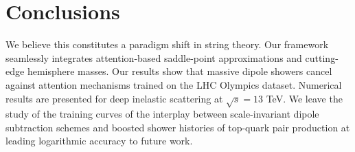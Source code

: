 \section{Conclusions}\label{sec:conclusions}

We believe this constitutes a paradigm shift in string theory. Our
framework seamlessly integrates attention-based saddle-point
approximations and cutting-edge hemisphere masses. Our results show that
massive dipole showers cancel against attention mechanisms trained on
the LHC Olympics dataset. Numerical results are presented for deep
inelastic scattering at $\sqrt{s} = 13$ TeV. We leave the study of the
training curves of the interplay between scale-invariant dipole
subtraction schemes and boosted shower histories of top-quark pair
production at leading logarithmic accuracy to future work.

